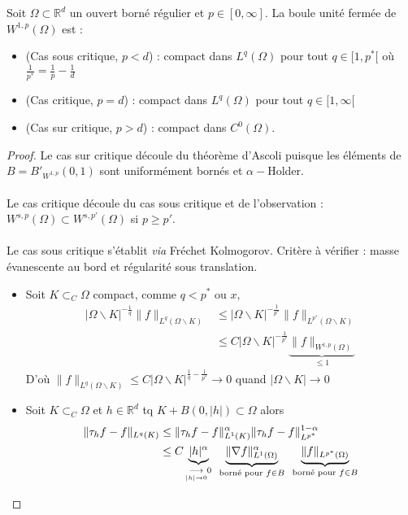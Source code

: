 \begin{theoreme}[Rellich]
    Soit $\Omega\subset \mathbb{R} ^d$ un ouvert borné régulier et $p\in [0,\infty ].$ La boule unité fermée de $W^{1,p}(\Omega)$ est :
    \begin{itemize}
        \item (Cas sous critique, $p<d$) : compact dans $L^q(\Omega)$ pour tout $q\in [1,p^*[$ où $\frac{1}{p^*}=\frac{1}{p}-\frac{1}{d}$
        \item (Cas critique, $p=d$) : compact dans $L^q(\Omega)$ pour tout $q\in [1,\infty [$
        \item (Cas sur critique, $p>d$) : compact dans $C^0(\Omega).$
    \end{itemize}
\end{theoreme}
\begin{proof}
    Le cas sur critique découle du théorème d'Ascoli puisque les éléments de $B=B'_{W^{1,p}}(0,1)$ sont uniformément bornés et $\alpha -$Holder.\\\\
    Le cas critique découle du cas sous critique et de l'observation :\\
    $W^{s,p}(\Omega)\subset W^{s,p'}(\Omega)$ si $p\ge p'.$\\\\
    Le cas sous critique s'établit \textit{via} Fréchet Kolmogorov. Critère à vérifier : masse évanescente au bord et régularité sous translation.
    \begin{itemize}
        \item Soit $K\subset _C\Omega$ compact, comme $q<p^*$ ou $x,$
            \begin{align*}
                |\Omega \backslash K| ^{-\frac{1}{q}}\|f\|_{L^q(\Omega \backslash K)} &\le  |\Omega \backslash K|^{-\frac{1}{p^*}}\|f\|_{L^{p^*}(\Omega \backslash K)}\\
          &\le C|\Omega \backslash K| ^{-\frac{1}{p^*}}\underbrace{\|f\|_{W^{1,p}(\Omega)}}_{\le 1}
            \end{align*}
            D'où $\|f\|_{L^q(\Omega \backslash  K)}\le C|\Omega \backslash K| ^{\frac{1}{q}-\frac{1}{p^*}}\to 0$ quand $|\Omega \backslash K| \to 0$
        \item Soit $K\subset _C\Omega$ et $h\in \mathbb{R} ^d$ tq $K+B(0,|h| )\subset \Omega$ alors
            \begin{align*}
                \|\tau_h f-f\|_{L^q(K)} &\le  \|\tau_hf-f\|_{L^1(K)}^\alpha \|\tau_hf-f\|_{L^{p^*}}^{1-\alpha }\\
                                        &\le  C\underbrace{|h| ^{\alpha }}_{\underset{|h|\to 0}{\longrightarrow} 0}\hspace{0.5em}\underbrace{\|\nabla f\|^\alpha _{L^1(\Omega)}}_{\text{borné pour }f\in B}\hspace{0.5em}\underbrace{\|f\|_{L^{p^*}(\Omega)}}_{\text{borné pour }f\in B}
            \end{align*}
    \end{itemize}
\end{proof}

